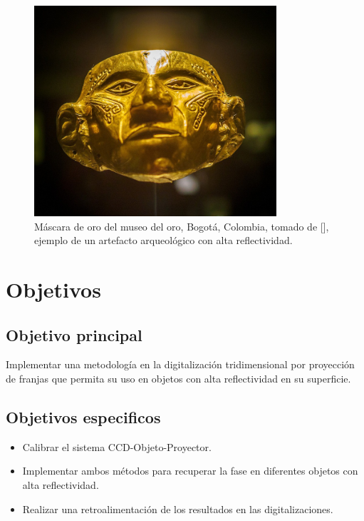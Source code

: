 \documentclass[UTF8]{article}
\begin{document}
\begin{figure}[h!]
\includegraphics[width=9cm]{Goldenmask.jpg}
\centering
\caption{Máscara de oro del museo del oro, Bogotá, Colombia, tomado de [], ejemplo de un artefacto arqueológico con alta reflectividad.}
\label{im5}
\end{figure}
\medskip




\section{Objetivos}  %

\subsection{Objetivo principal}

%
Implementar una metodología en la digitalización tridimensional por proyección de franjas que permita su uso en objetos con alta reflectividad en su superficie.
\medskip

\subsection{Objetivos especificos} 

\begin{itemize}
\item Calibrar el sistema CCD-Objeto-Proyector.
\item Implementar ambos métodos para recuperar la fase en diferentes objetos con alta reflectividad.
\item Realizar una retroalimentación de los resultados en las digitalizaciones.
\end{itemize}
\end{document}

